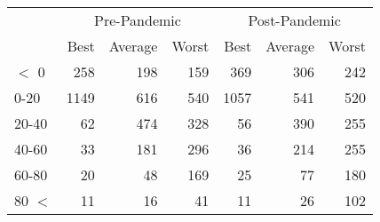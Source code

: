
\begin{tabular}[t]{lrrrrrr}
\toprule
\multicolumn{1}{c}{ } & \multicolumn{3}{c}{Pre-Pandemic} & \multicolumn{3}{c}{Post-Pandemic} \\
\cmidrule(l{3pt}r{3pt}){2-4} \cmidrule(l{3pt}r{3pt}){5-7}
 & Best & Average & Worst & Best & Average & Worst\\
\midrule
$<$ 0 & 258 & 198 & 159 & 369 & 306 & 242\\
0-20 & 1149 & 616 & 540 & 1057 & 541 & 520\\
20-40 & 62 & 474 & 328 & 56 & 390 & 255\\
40-60 & 33 & 181 & 296 & 36 & 214 & 255\\
60-80 & 20 & 48 & 169 & 25 & 77 & 180\\
80 $<$ & 11 & 16 & 41 & 11 & 26 & 102\\
\bottomrule
\end{tabular}
